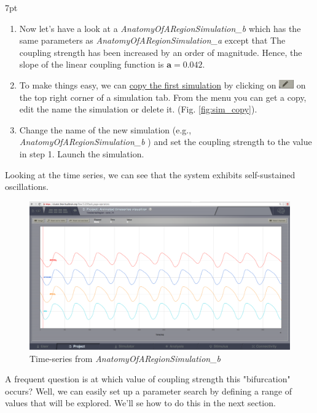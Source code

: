 \documentclass{tufte-handout}
\newenvironment{simulation}{%
  \def\FrameCommand{%
    \hspace{1pt}%
    {\color{ForestGreen}\vrule width 2pt}%
    {\color{simulationshade}\vrule width 4pt}%
    \colorbox{simulationshade}%
  }%
  \MakeFramed{\advance\hsize-\width\FrameRestore}%
  \noindent\hspace{-4.55pt}%
  \begin{adjustwidth}{}{7pt}%
  \vspace{2pt}\vspace{2pt}%
}
{%
  \vspace{2pt}\end{adjustwidth}\endMakeFramed%
}
\begin{document}
\begin{simulation}
\begin{enumerate}
\item Now let's have a look at a \textit{AnatomyOfARegionSimulation\_b} which has the same parameters as \textit{AnatomyOfARegionSimulation\_a} except that
The coupling strength has been increased by an order of magnitude. Hence, the slope of the linear coupling function is  $\mathbf{a=0.042}$.
\item To make things easy, we can \underline{copy the first simulation}  by clicking on \includegraphics[width=0.05\textwidth]{butt_pencil.png} on the top right corner of a simulation tab. 
From the menu you can get a copy, edit the name the simulation or delete it. (Fig. \ref{fig:sim_copy}).
\item Change the name of the new simulation (e.g., \textit{AnatomyOfARegionSimulation\_b} ) and set the coupling strength to the value in step 1. Launch the simulation.
\end{enumerate}
\end{simulation}


Looking at the time series, we can see that the system exhibits self-sustained
oscillations. 

\begin{figure}[h]
  \includegraphics[width=\linewidth]{Handout_UI_BuildingYourOwnBrainNetworkModel_AnimatedTimeSeriesOscillatory}%
  \caption{Time-series from \textit{AnatomyOfARegionSimulation\_b}}%
  \label{fig:time_series_oscillatory}%
\end{figure}


A frequent question is at which value of coupling strength this
"bifurcation" occurs? Well, we can easily set up a parameter search by defining a
range of values that will be explored. We'll se how to do this in the next section.
\end{document}
